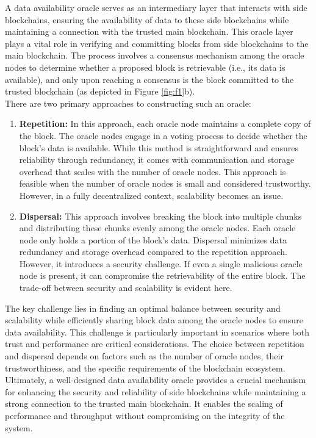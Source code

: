 \documentclass{report}
\begin{document}
A data availability oracle serves as an intermediary layer that interacts with side blockchains, ensuring the availability of data to these side blockchains while maintaining a connection with the trusted main blockchain. This oracle layer plays a vital role in verifying and committing blocks from side blockchains to the main blockchain. The process involves a consensus mechanism among the oracle nodes to determine whether a proposed block is retrievable (i.e., its data is available), and only upon reaching a consensus is the block committed to the trusted blockchain (as depicted in Figure \ref{fig:f1}b).\\
There are two primary approaches to constructing such an oracle:
\begin{enumerate}
	\item \textbf{Repetition:} In this approach, each oracle node maintains a complete copy of the block. The oracle nodes engage in a voting process to decide whether the block's data is available. While this method is straightforward and ensures reliability through redundancy, it comes with communication and storage overhead that scales with the number of oracle nodes. This approach is feasible when the number of oracle nodes is small and considered trustworthy. However, in a fully decentralized context, scalability becomes an issue.
	\item \textbf{Dispersal:} This approach involves breaking the block into multiple chunks and distributing these chunks evenly among the oracle nodes. Each oracle node only holds a portion of the block's data. Dispersal minimizes data redundancy and storage overhead compared to the repetition approach. However, it introduces a security challenge. If even a single malicious oracle node is present, it can compromise the retrievability of the entire block. The trade-off between security and scalability is evident here.
\end{enumerate}
The key challenge lies in finding an optimal balance between security and scalability while efficiently sharing block data among the oracle nodes to ensure data availability. This challenge is particularly important in scenarios where both trust and performance are critical considerations. The choice between repetition and dispersal depends on factors such as the number of oracle nodes, their trustworthiness, and the specific requirements of the blockchain ecosystem.\\
Ultimately, a well-designed data availability oracle provides a crucial mechanism for enhancing the security and reliability of side blockchains while maintaining a strong connection to the trusted main blockchain. It enables the scaling of performance and throughput without compromising on the integrity of the system.
\end{document}
